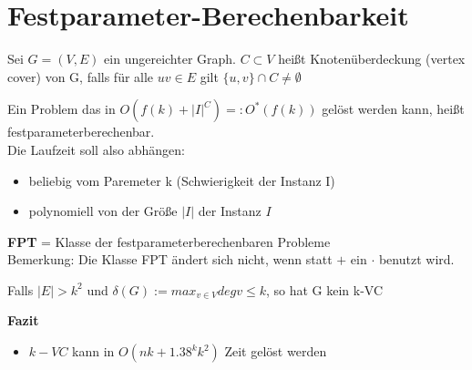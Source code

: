\documentclass[14pt]{article}
\begin{document}
\section{Festparameter-Berechenbarkeit}
\begin{definition} 
    Sei $G = (V, E)$ ein ungereichter Graph. $C \subset V$ heißt Knotenüberdeckung
    (vertex cover) von G, falls für alle $uv \in E$ gilt $\{u, v\} \cap C \neq \emptyset$
\end{definition}
\begin{definition} 
    Ein Problem das in $O(f(k) + |I|^C) =: O^*(f(k))$ gelöst werden kann, heißt festparameterberechenbar. \\
    Die Laufzeit soll also abhängen:
    \begin{itemize}
        \item beliebig vom Paremeter k (Schwierigkeit der Instanz I)
        \item polynomiell von der Größe $|I|$ der Instanz $I$
    \end{itemize}
    \textbf{FPT} = Klasse der festparameterberechenbaren Probleme \\
    Bemerkung: Die Klasse FPT ändert sich nicht, wenn statt $+$ ein $\cdot$ benutzt wird.
\end{definition}
\begin{eigenschaft}
    Falls $|E| > k^2$ und $\delta(G) := max_{v \in V}deg v \leq k$, so hat G kein 
    k-VC
\end{eigenschaft}
\textbf{Fazit}
\begin{itemize}
    \item $k-VC$ kann in $O(nk + 1.38^kk^2)$ Zeit gelöst werden
\end{itemize}
\end{document}

